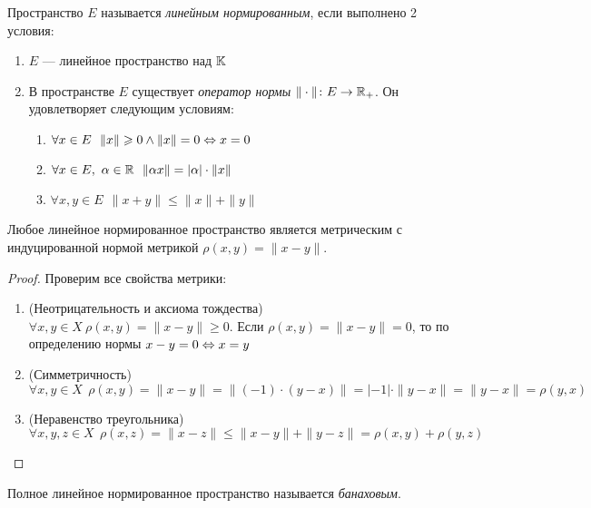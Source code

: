 \begin{definition}
	Пространство $E$ называется \textit{линейным нормированным}, если выполнено 2 условия:
	\begin{enumerate}
		\item $E$ --- линейное пространство над $\mathbb{K}$
		
		\item В пространстве $E$ существует \textit{оператор нормы} $\|\cdot\| \colon E \to \mathbb{R}_+$. Он удовлетворяет следующим условиям:
		\begin{enumerate}
			\item $\forall x \in E\ \ \|x\| \geqslant 0 \wedge \|x\| = 0 \Leftrightarrow x = 0$
			
			\item $\forall x \in E,\ \alpha \in \R\ \ \|\alpha x\| = |\alpha| \cdot \|x\|$
			
			\item $\forall x, y \in E\ \ \|x  + y\| \le \|x\| + \|y\|$
		\end{enumerate}
	\end{enumerate}
\end{definition}

\begin{proposition}
	Любое линейное нормированное пространство является метрическим с индуцированной нормой метрикой $\rho(x, y) = \|x - y\|$.
\end{proposition}

\begin{proof}
	Проверим все свойства метрики:
	\begin{enumerate}
		\item (Неотрицательность и аксиома тождества) $\forall x, y \in X\ \rho(x, y) = \|x - y\| \ge 0$. Если $\rho(x, y) = \|x - y\| = 0$, то по определению нормы $x - y = 0 \Leftrightarrow x = y$
		
		\item (Симметричность) 
		\[
			\forall x, y \in X\ \ \rho(x, y) = \|x - y\| = \|(-1) \cdot (y - x)\| = |-1| \cdot \|y - x\| = \|y - x\| = \rho(y, x)
		\]
		
		\item (Неравенство треугольника) 
		\[
			\forall x, y, z \in X\ \ \rho(x, z) = \|x - z\| \le \|x - y\| + \|y - z\| = \rho(x, y) + \rho(y, z)
		\]
	\end{enumerate}
\end{proof}

\begin{definition}
	Полное линейное нормированное пространство называется \textit{банаховым}.
\end{definition}

